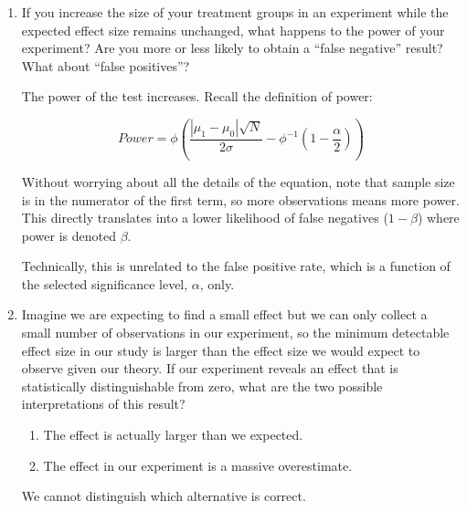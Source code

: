 \documentclass[a4paper]{exam}
\begin{document}
\begin{enumerate}
\begin{enumerate}
\begin{solution}
	\end{solution}
	
	\item If you increase the size of your treatment groups in an experiment while the expected effect size remains unchanged, what happens to the power of your experiment? Are you more or less likely to obtain a ``false negative'' result? What about ``false positives''?
	
	\begin{solution}
	
	The power of the test increases. Recall the definition of power:
	
	\begin{equation}
	Power = \phi\left( \frac{|\mu_1 - \mu_0|\sqrt{N}}{2\sigma} - \phi^{-1}\left( 1 - \frac{\alpha}{2} \right) \right)
	\end{equation}
	
	Without worrying about all the details of the equation, note that sample size is in the numerator of the first term, so more observations means more power. This directly translates into a lower likelihood of false negatives ($1-\beta$) where power is denoted $\beta$.
	
	Technically, this is unrelated to the false positive rate, which is a function of the selected significance level, $\alpha$, only.
	
	\end{solution}
	
	\item Imagine we are expecting to find a small effect but we can only collect a small number of observations in our experiment, so the minimum detectable effect size in our study is larger than the effect size we would expect to observe given our theory. If our experiment reveals an effect that is statistically distinguishable from zero, what are the two possible interpretations of this result?
	
	\begin{solution}
	
	\begin{enumerate}
	\item The effect is actually larger than we expected.
	\item The effect in our experiment is a massive overestimate.
	\end{enumerate}
	
	We cannot distinguish which alternative is correct.
	
	\end{solution}
	

\end{enumerate}
\end{enumerate}
\end{document}
